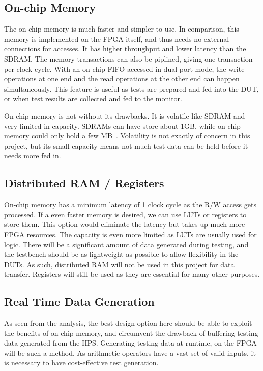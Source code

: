 \subsection{On-chip Memory}
The on-chip memory is much faster and simpler to use.
In comparison, this memory is implemented on the FPGA itself, and thus needs no external connections for accesses.
It has higher throughput and lower latency than the SDRAM.
The memory transactions can also be piplined, giving one transaction per clock cycle.
With an on-chip FIFO accessed in dual-port mode, the write operations at one end and the read operations at the other end can happen simultaneously.
This feature is useful as tests are prepared and fed into the DUT, or when test results are collected and fed to the monitor.

On-chip memory is not without its drawbacks.
It is volatile like SDRAM and very limited in capacity.
SDRAMs can have store about 1GB, while on-chip memory could only hold a few MB~\cite{Altera2}.
Volatility is not exactly of concern in this project, but its small capacity means not much test data can be held before it needs more fed in.

\subsection{Distributed RAM / Registers}
On-chip memory has a minimum latency of 1 clock cycle as the R/W access gets processed.
If a even faster memory is desired, we can use LUTs or registers to store them.
This option would eliminate the latency but takes up much more FPGA resources.
The capacity is even more limited as LUTs are usually used for logic.
There will be a significant amount of data generated during testing, and the testbench should be as lightweight as possible to allow flexibility in the DUTs.
As such, distributed RAM will not be used in this project for data transfer.
Registers will still be used as they are essential for many other purposes.

\subsection{Real Time Data Generation}
As seen from the analysis, the best design option here should be able to exploit the benefits of on-chip memory, and circumvent the drawback of buffering testing data generated from the HPS.
Generating testing data at runtime, on the FPGA will be such a method.
As arithmetic operators have a vast set of valid inputs, it is necessary to have cost-effective test generation.

